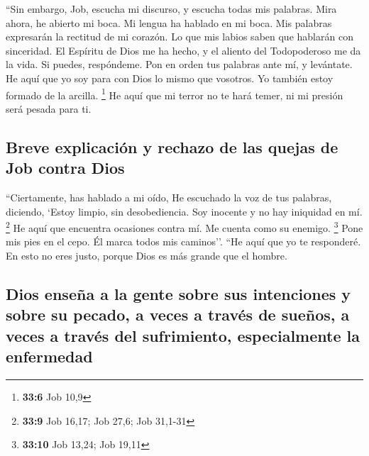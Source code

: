 \begin{paracol}{2}
 ``Sin embargo, Job, escucha mi discurso, y escucha todas
mis palabras.  Mira ahora, he abierto mi boca. Mi lengua
ha hablado en mi boca.  Mis palabras expresarán la
rectitud de mi corazón. Lo que mis labios saben que hablarán con
sinceridad.  El Espíritu de Dios me ha hecho, y el aliento
del Todopoderoso me da la vida.  Si puedes, respóndeme.
Pon en orden tus palabras ante mí, y levántate.  He aquí
que yo soy para con Dios lo mismo que vosotros. Yo también estoy formado
de la arcilla. \footnote{\textbf{33:6} Job 10,9}  He aquí
que mi terror no te hará temer, ni mi presión será pesada para ti.

\hypertarget{breve-explicaciuxf3n-y-rechazo-de-las-quejas-de-job-contra-dios}{%
\subsection{Breve explicación y rechazo de las quejas de Job contra
Dios}\label{breve-explicaciuxf3n-y-rechazo-de-las-quejas-de-job-contra-dios}}

 ``Ciertamente, has hablado a mi oído, He escuchado la voz
de tus palabras, diciendo,  `Estoy limpio, sin
desobediencia. Soy inocente y no hay iniquidad en mí. \footnote{\textbf{33:9}
  Job 16,17; Job 27,6; Job 31,1-31}  He aquí que
encuentra ocasiones contra mí. Me cuenta como su enemigo. \footnote{\textbf{33:10}
  Job 13,24; Job 19,11}  Pone mis pies en el cepo. Él
marca todos mis caminos''.  ``He aquí que yo te
responderé. En esto no eres justo, porque Dios es más grande que el
hombre.

\hypertarget{dios-enseuxf1a-a-la-gente-sobre-sus-intenciones-y-sobre-su-pecado-a-veces-a-travuxe9s-de-sueuxf1os-a-veces-a-travuxe9s-del-sufrimiento-especialmente-la-enfermedad}{%
\subsection{Dios enseña a la gente sobre sus intenciones y sobre su
pecado, a veces a través de sueños, a veces a través del sufrimiento,
especialmente la
enfermedad}\label{dios-enseuxf1a-a-la-gente-sobre-sus-intenciones-y-sobre-su-pecado-a-veces-a-travuxe9s-de-sueuxf1os-a-veces-a-travuxe9s-del-sufrimiento-especialmente-la-enfermedad}}


\end{paracol}
